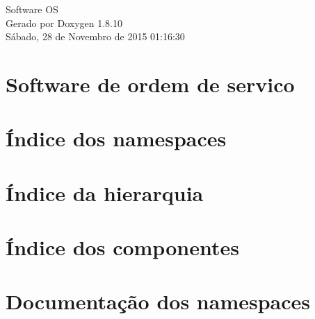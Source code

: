\documentclass[twoside]{book}
\newcommand{\+}{\discretionary{\mbox{\scriptsize$\hookleftarrow$}}{}{}}
\newcommand{\clearemptydoublepage}{%
  \newpage{\pagestyle{empty}\cleardoublepage}%
}
\begin{document}
\hypersetup{pageanchor=false,
             bookmarks=true,
             bookmarksnumbered=true,
             pdfencoding=unicode
            }
\begin{titlepage}
\vspace*{7cm}
\begin{center}%
{\Large Software O\+S }\\
\vspace*{1cm}
{\large Gerado por Doxygen 1.8.10}\\
\vspace*{0.5cm}
{\small Sábado, 28 de Novembro de 2015 01:16:30}\\
\end{center}
\end{titlepage}
\clearemptydoublepage
\tableofcontents
\clearemptydoublepage
{}
\hypersetup{pageanchor=true}

\chapter{Software de ordem de servico}
\label{md__c_1__cristiano__projetos__software_ordem_de_servico__r_e_a_d_m_e}
\hypertarget{md__c_1__cristiano__projetos__software_ordem_de_servico__r_e_a_d_m_e}{}

\chapter{Índice dos namespaces}

\chapter{Índice da hierarquia}

\chapter{Índice dos componentes}

\chapter{Documentação dos namespaces}













\end{document}
